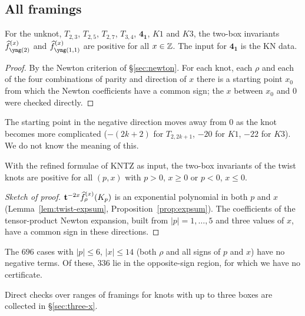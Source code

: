 \subsection{All framings}
\begin{theorem}\label{thm:two-all-x}
For the unknot, $T_{2,3}$, $T_{2,5}$, $T_{2,7}$, $T_{3,4}$, $\mathbf{4_1}$, $K1$ and $K3$, the two-box invariants $\hf^{(x)}_{\yng(2)}$ and $\hf^{(x)}_{\yng(1,1)}$ are positive for all $x\in\mathbb{Z}$.
The input for $\mathbf{4_1}$ is the KN data.
\end{theorem}
\begin{proof}
By the Newton criterion of \S\ref{sec:newton}. For each knot, each $\rho$ and each of the four combinations of parity and direction of $x$ there is a starting point $x_0$ from which the Newton coefficients have a common sign;
the $x$ between $x_0$ and $0$ were checked directly.
\end{proof}
The starting point in the negative direction moves away from $0$ as the knot becomes more complicated ($-(2k+2)$ for $T_{2,2k+1}$, $-20$ for $K1$, $-22$ for $K3$). We do not know the meaning of this.
\begin{theorem}\label{thm:twist-x}
With the refined formulae of KNTZ as input, the two-box invariants of the twist knots are positive for all $(p,x)$ with $p>0$, $x\ge0$ or $p<0$, $x\le0$.
\end{theorem}
\begin{proof}[Sketch of proof]
$\mathbf{t}^{-2x}\widehat{f}^{(x)}_\rho(K_p)$ is an exponential polynomial in both $p$ and $x$ (Lemma~\ref{lem:twist-expsum}, Proposition~\ref{prop:expsum}).
The coefficients of the tensor-product Newton expansion, built from $|p|=1,\dots,5$ and three values of $x$, have a common sign in these directions.
\end{proof}
\begin{compresult}
The $696$ cases with $|p|\le6$, $|x|\le14$ (both $\rho$ and all signs of $p$ and $x$) have no negative terms.
Of these, $336$ lie in the opposite-sign region, for which we have no certificate.
\end{compresult}
Direct checks over ranges of framings for knots with up to three boxes are collected in \S\ref{sec:three-x}.
